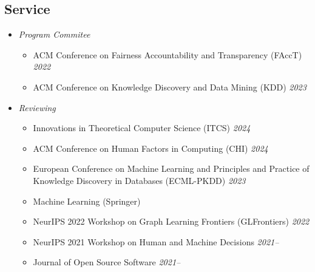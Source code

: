\documentclass[margin]{res}
\begin{document}
\begin{resume}
\section{Service} 
%
%

\begin{itemize}[nosep]
	\item \emph{Program Commitee}
	\begin{itemize}[nosep]
		\item ACM Conference on Fairness Accountability and Transparency (FAccT) \hfill \emph{2022}
		\item ACM Conference on Knowledge Discovery and Data Mining (KDD) \hfill \emph{2023}
	\end{itemize}
	\item \emph{Reviewing}
	\begin{itemize}[nosep]
		\item Innovations in Theoretical Computer Science (ITCS) \hfill \emph{2024}
		\item ACM Conference on Human Factors in Computing (CHI) \hfill \emph{2024}
		\item European Conference on Machine Learning and Principles and Practice of Knowledge Discovery in Databases (ECML-PKDD) \hfill \emph{2023}
		\item Machine Learning (Springer)
		\item NeurIPS 2022 Workshop on Graph Learning Frontiers (GLFrontiers) \hfill \emph{2022}
		\item NeurIPS 2021 Workshop on Human and Machine Decisions \hfill \emph{2021--} 
		\item Journal of Open Source Software \hfill \emph{2021--}
	\end{itemize}
	

\end{itemize}
\end{resume}
\end{document}
